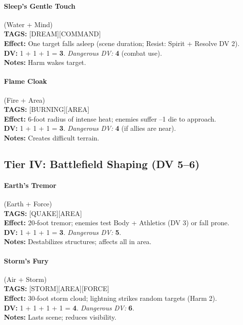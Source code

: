 \paragraph{Sleep's Gentle Touch} (Water + Mind) \\
\textbf{TAGS:} {[DREAM][COMMAND]} \\
\textbf{Effect:} One target falls asleep (scene duration; Resist: Spirit + Resolve DV 2). \\
\textbf{DV:} 1 + 1 + 1 = \textbf{3}. \emph{Dangerous DV:} \textbf{4} (combat use). \\
\textbf{Notes:} Harm wakes target.

\paragraph{Flame Cloak} (Fire + Area) \\
\textbf{TAGS:} {[BURNING][AREA]} \\
\textbf{Effect:} 6‑foot radius of intense heat; enemies suffer --1 die to approach. \\
\textbf{DV:} 1 + 1 + 1 = \textbf{3}. \emph{Dangerous DV:} \textbf{4} (if allies are near). \\
\textbf{Notes:} Creates difficult terrain.

\subsection{Tier IV: Battlefield Shaping (DV 5--6)}

\paragraph{Earth's Tremor} (Earth + Force) \\
\textbf{TAGS:} {[QUAKE][AREA]} \\
\textbf{Effect:} 20‑foot tremor; enemies test Body + Athletics (DV 3) or fall prone. \\
\textbf{DV:} 1 + 1 + 1 = \textbf{3}. \emph{Dangerous DV:} \textbf{5}. \\
\textbf{Notes:} Destabilizes structures; affects all in area.

\paragraph{Storm's Fury} (Air + Storm) \\
\textbf{TAGS:} {[STORM][AREA][FORCE]} \\
\textbf{Effect:} 30‑foot storm cloud; lightning strikes random targets (Harm 2). \\
\textbf{DV:} 1 + 1 + 1 + 1 = \textbf{4}. \emph{Dangerous DV:} \textbf{6}. \\
\textbf{Notes:} Lasts scene; reduces visibility.

